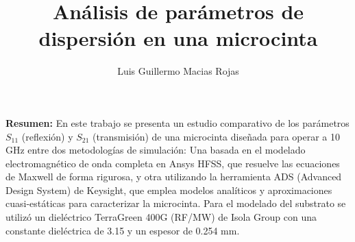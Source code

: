 \documentclass{article}   %
\title{Análisis de parámetros de dispersión en una microcinta}
\author{Luis Guillermo Macias Rojas}
\theoremstyle{mytheoremstyle}
\theoremstyle{mytheoremstyle}
\theoremstyle{myproblemstyle}
\begin{document}
    \maketitle

    \selectfont %
    \noindent
    \textbf{Resumen:} En este trabajo se presenta un estudio comparativo de los parámetros $S_{11}$ (reflexión) y $S_{21}$ (transmisión)
    de una microcinta diseñada para operar a 10 GHz entre dos metodologías de simulación: Una basada en el
    modelado electromagnético de onda completa en Ansys HFSS, que resuelve las ecuaciones de Maxwell de forma rigurosa, y
    otra utilizando la herramienta ADS (Advanced Design System) de Keysight, que emplea modelos analíticos y aproximaciones
    cuasi-estáticas para caracterizar la microcinta. Para el modelado del substrato se utilizó un dieléctrico TerraGreen 400G (RF/MW)
    de Isola Group con una constante dieléctrica de 3.15 y un espesor de 0.254 mm.
\end{document}
